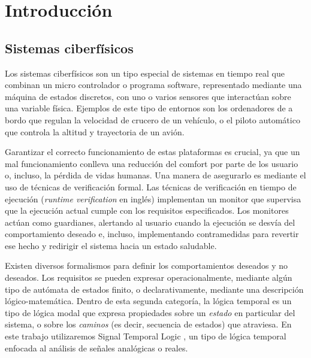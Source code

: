 %
%
%

\chapter{Introducción}

\section{Sistemas ciberfísicos}
Los sistemas ciberfísicos son un tipo especial de sistemas en tiempo real que combinan un micro controlador o programa software, representado mediante una máquina de estados discretos, con uno o varios sensores que interactúan sobre una variable física. Ejemplos de este tipo de entornos son los ordenadores de a bordo que regulan la velocidad de crucero de un vehículo, o el piloto automático que controla la altitud y trayectoria de un avión.

Garantizar el correcto funcionamiento de estas plataformas es crucial, ya que un mal funcionamiento conlleva una reducción del comfort por parte de los usuario o, incluso, la pérdida de vidas humanas. Una manera de asegurarlo es mediante el uso de técnicas de verificación formal. Las técnicas de verificación en tiempo de ejecución \cite{STTT_RV_21} (\emph{runtime verification} en inglés) implementan un monitor que supervisa que la ejecución actual cumple con los requisitos especificados. Los monitores actúan como guardianes, alertando al usuario cuando la ejecución se desvía del comportamiento deseado e, incluso, implementando contramedidas para revertir ese hecho y redirigir el sistema hacia un estado saludable. 

Existen diversos formalismos para definir los comportamientos deseados y no deseados. Los requisitos se pueden expresar operacionalmente, mediante algún tipo de autómata de estados finito, o declarativamente, mediante una descripción lógico-matemática. Dentro de esta segunda categoría, la lógica temporal es un tipo de lógica modal que expresa propiedades sobre un \emph{estado} en particular del sistema, o sobre los \emph{caminos} (es decir, secuencia de estados) que atraviesa. En este trabajo utilizaremos Signal Temporal Logic \cite{STL}, un tipo de lógica temporal enfocada al análisis de señales analógicas o reales.

